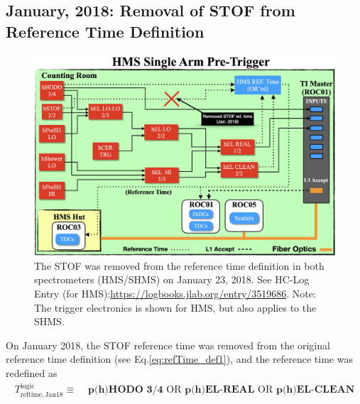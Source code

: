 \documentclass[11pt]{article}
\begin{document}
\subsection{January, 2018: Removal of STOF from Reference Time Definition}\label{ssec:jan2018}
\begin{figure}[H]
  \centering
  \includegraphics[scale=0.38]{images/Jan2018_trigger_change.png}
  \caption{The STOF was removed from the reference time definition in both spectrometers (HMS/SHMS) on January 23, 2018. See HC-Log Entry (for HMS):\url{https://logbooks.jlab.org/entry/3519686}. Note: The trigger
  electronics is shown for HMS, but also applies to the SHMS.}
  \label{fig:stof_refTime_remove}
\end{figure}
On January 2018, the STOF reference time was removed from the original reference time definition (see Eq.\ref{eq:refTime_def1}), and the reference time was redefined as
\begin{align}
  T^{\mathrm{logic}}_{\mathrm{reftime,Jan18}} \equiv &\textbf{ p(h)HODO 3/4} \text{ OR } \textbf{p(h)EL-REAL} \text{ OR } \textbf{p(h)EL-CLEAN}
  \label{eq:refTime_def2}
\end{align}
\end{document}
